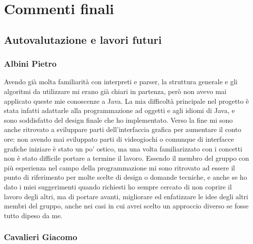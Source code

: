 \chapter{Commenti finali}

\section{Autovalutazione e lavori futuri}

\subsection{Albini Pietro}

Avendo già molta familiarità con interpreti e parser, la struttura generale e
gli algoritmi da utilizzare mi erano già chiari in partenza, però non avevo mai
applicato queste mie conoscenze a Java. La mia difficoltà principale nel
progetto è stata infatti adattarle alla programmazione ad oggetti e agli idiomi
di Java, e sono soddisfatto del design finale che ho implementato. Verso la
fine mi sono anche ritrovato a sviluppare parti dell'interfaccia grafica per
aumentare il conto ore: non avendo mai sviluppato parti di videogiochi o
comunque di interfacce grafiche iniziare è stato un po' ostico, ma una volta
familiarizzato con i concetti non è stato difficile portare a termine il
lavoro. Essendo il membro del gruppo con più esperienza nel campo della
programmazione mi sono ritrovato ad essere il punto di riferimento per molte
scelte di design o domande tecniche, e anche se ho dato i miei suggerimenti
quando richiesti ho sempre cercato di non coprire il lavoro degli altri, ma di
portare avanti, migliorare ed enfatizzare le idee degli altri membri del
gruppo, anche nei casi in cui avrei scelto un approccio diverso se fosse tutto
dipeso da me.

\subsection{Cavalieri Giacomo}

